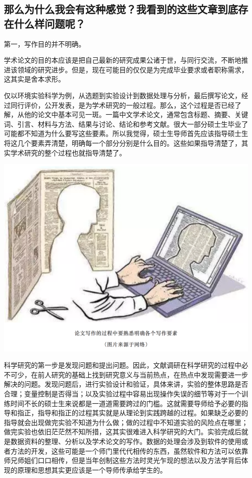 \documentclass[]{book}
\begin{document}
\subsection{那么为什么我会有这种感觉？我看到的这些文章到底存在什么样问题呢？}

第一，写作目的并不明确。

学术论文的目的本应该是把自己最新的研究成果公诸于世，与同行交流，不断地推进该领域的研究进步。但是，现在可能目的仅仅是为完成毕业要求或者职称需求，这其实是舍本求形。

仅以环境实验科学为例，从选题到实验设计到数据处理与分析，最后撰写论文，经过同行评价，公开发表，是为学术研究的一般过程。那么，这个过程是否已经了解，从他的论文中基本可见一斑。一篇中文学术论文，通常包含标题、摘要、关键词、引言、材料与方法、结果与讨论、结论和参考文献。很大一部分硕士生毕业了可能都不知道为什么要写这些要素。所以我觉得，硕士生导师首先应该指导硕士生将这几个要素弄清楚，明确每一个部分分别是什么目的。这些如果指导清楚了，其实学术研究的整个过程也就指导清楚了。

\includegraphics[width=8.33in]{images/edit2}

科学研究的第一步是发现问题和提出问题。因此，文献调研在科学研究的过程中必不可少，在前人研究的基础上找到研究意义与当前热点，在热点中发现需要进一步解决的问题。发现问题后，进行实验设计和验证，具体来讲，实验的整体思路是否合理；变量控制是否得当；以及实验过程中容易出现操作失误的细节等对于一个训练时间不长的硕士生来说都是一道道需要跨过的门槛。这就需要导师给予必要的指导和指正，指导和指正的过程其实就是从理论到实践跨越的过程。如果缺乏必要的指导就会出现做完实验不知道为什么做；做的过程中不知道实验的风险点在哪里；做完实验也依旧茫茫然不知所措，这其实很难进入科学研究的大门。实验完成后就是数据资料的整理、分析以及学术论文的写作。数据的处理会涉及到软件的使用或者方法的开发，这些可能是一个师门里代代相传的东西，虽然软件和方法可以依靠师兄师姐们口口相传，但是当年创制这些方法时灵光乍现的想法以及方法学背后体现的原理和思想其实更应该是一个导师传承给学生的。
\end{document}
